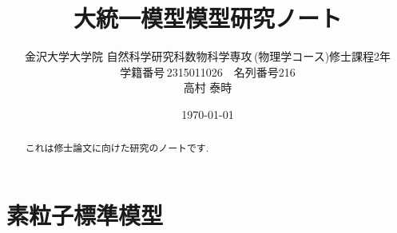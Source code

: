 \documentclass[titlepage]{jsarticle}
\begin{document}
\title{大統一模型模型研究ノート}
\author{金沢大学大学院\,\,自然科学研究科数物科学専攻\,(物理学コース)修士課程2年\\学籍番号\,2315011026$\quad$名列番号216\\高村 泰時} 
\date{\today}
\maketitle

\begin{abstract}
  これは修士論文に向けた研究のノートです.
\end{abstract}

\section{素粒子標準模型}

\end{document}
